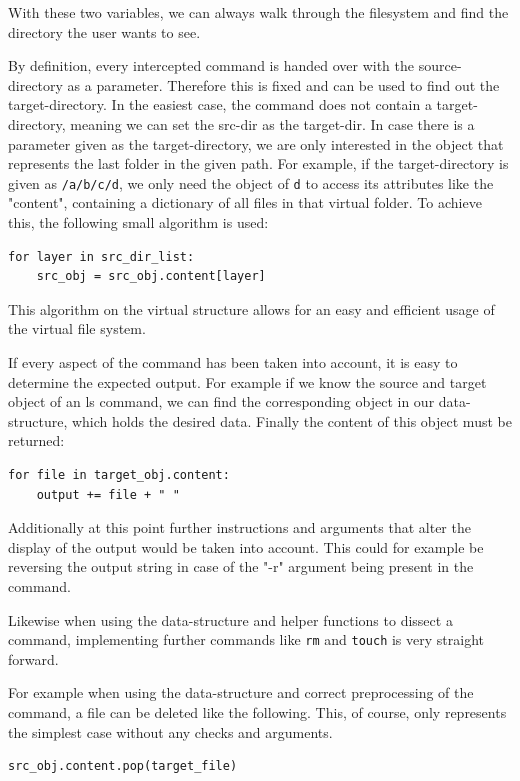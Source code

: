 With these two variables, we can always walk through the filesystem and find the directory the user wants to see.

By definition, every intercepted command is handed over with the source-directory as a parameter. Therefore this is fixed and can be used to find out the target-directory.
In the easiest case, the command does not contain a target-directory, meaning we can set the src-dir as the target-dir.
In case there is a parameter given as the target-directory, we are only interested in the object that represents the last folder in the given path.
For example, if the target-directory is given as \texttt{/a/b/c/d}, we only need the object of \texttt{d} to access its attributes like the "content", containing a dictionary of all files in that virtual folder.
To achieve this, the following small algorithm is used:

\begin{lstlisting}
for layer in src_dir_list:
    src_obj = src_obj.content[layer]
\end{lstlisting}

This algorithm on the virtual structure allows for an easy and efficient usage of the virtual file system.

If every aspect of the command has been taken into account, it is easy to determine the expected output.
For example if we know the source and target object of an ls command, we can find the corresponding object in our data-structure, which holds the desired data.
Finally the content of this object must be returned:

\begin{lstlisting}
for file in target_obj.content:
    output += file + " "
\end{lstlisting}

Additionally at this point further instructions and arguments that alter the display of the output would be taken into account.
This could for example be reversing the output string in case of the "-r" argument being present in the command.

Likewise when using the data-structure and helper functions to dissect a command, implementing further commands like \texttt{rm} and \texttt{touch} is very straight forward.

For example when using the data-structure and correct preprocessing of the command, a file can be deleted like the following.
This, of course, only represents the simplest case without any checks and arguments.

\begin{lstlisting}
src_obj.content.pop(target_file)
\end{lstlisting}

